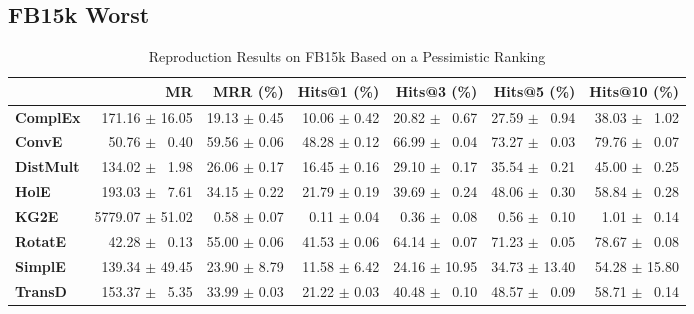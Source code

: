 \documentclass[journal]{IEEEtran}
\begin{document}
\subsection{FB15k Worst}
    \begin{table*}
        \caption{Reproduction Results on FB15k Based on a Pessimistic Ranking}
        \label{tab:fb15k_full_results_pessimistic_ranking}
        \centering
        \begin{tabular}{lrrrrrr}
\toprule
{} &               MR &      MRR (\%) &   Hits@1 (\%) &    Hits@3 (\%) &    Hits@5 (\%) &   Hits@10 (\%) \\
\midrule
\textbf{ComplEx } &  $\phantom{5}$171.16 $\pm$ 16.05 &  19.13 $\pm$ 0.45 &  10.06 $\pm$ 0.42 &  20.82 $\pm$ $\phantom{5}$0.67 &  27.59 $\pm$ $\phantom{5}$0.94 &  38.03 $\pm$ $\phantom{5}$1.02 \\
\textbf{ConvE   } &  $\phantom{5}$$\phantom{5}$50.76 $\pm$ $\phantom{5}$0.40 &  59.56 $\pm$ 0.06 &  48.28 $\pm$ 0.12 &  66.99 $\pm$ $\phantom{5}$0.04 &  73.27 $\pm$ $\phantom{5}$0.03 &  79.76 $\pm$ $\phantom{5}$0.07 \\
\textbf{DistMult} &  $\phantom{5}$134.02 $\pm$ $\phantom{5}$1.98 &  26.06 $\pm$ 0.17 &  16.45 $\pm$ 0.16 &  29.10 $\pm$ $\phantom{5}$0.17 &  35.54 $\pm$ $\phantom{5}$0.21 &  45.00 $\pm$ $\phantom{5}$0.25 \\
\textbf{HolE    } &  $\phantom{5}$193.03 $\pm$ $\phantom{5}$7.61 &  34.15 $\pm$ 0.22 &  21.79 $\pm$ 0.19 &  39.69 $\pm$ $\phantom{5}$0.24 &  48.06 $\pm$ $\phantom{5}$0.30 &  58.84 $\pm$ $\phantom{5}$0.28 \\
\textbf{KG2E    } &  5779.07 $\pm$ 51.02 &  $\phantom{5}$0.58 $\pm$ 0.07 &  $\phantom{5}$0.11 $\pm$ 0.04 &  $\phantom{5}$0.36 $\pm$ $\phantom{5}$0.08 &  $\phantom{5}$0.56 $\pm$ $\phantom{5}$0.10 &  $\phantom{5}$1.01 $\pm$ $\phantom{5}$0.14 \\
\textbf{RotatE  } &  $\phantom{5}$$\phantom{5}$42.28 $\pm$ $\phantom{5}$0.13 &  55.00 $\pm$ 0.06 &  41.53 $\pm$ 0.06 &  64.14 $\pm$ $\phantom{5}$0.07 &  71.23 $\pm$ $\phantom{5}$0.05 &  78.67 $\pm$ $\phantom{5}$0.08 \\
\textbf{SimplE  } &  $\phantom{5}$139.34 $\pm$ 49.45 &  23.90 $\pm$ 8.79 &  11.58 $\pm$ 6.42 &  24.16 $\pm$ 10.95 &  34.73 $\pm$ 13.40 &  54.28 $\pm$ 15.80 \\
\textbf{TransD  } &  $\phantom{5}$153.37 $\pm$ $\phantom{5}$5.35 &  33.99 $\pm$ 0.03 &  21.22 $\pm$ 0.03 &  40.48 $\pm$ $\phantom{5}$0.10 &  48.57 $\pm$ $\phantom{5}$0.09 &  58.71 $\pm$ $\phantom{5}$0.14 \\

\end{tabular}
\end{table*}
\end{document}
